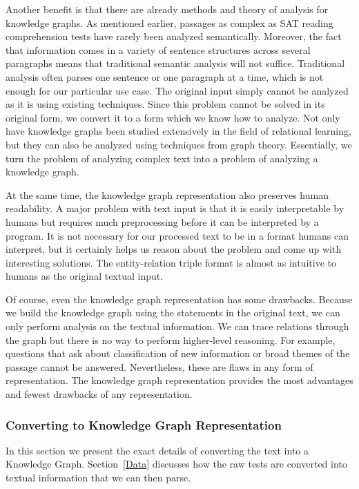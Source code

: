\documentclass[pageno]{jpaper}
\begin{document}
Another benefit is that there are already methods and theory of analysis for
knowledge graphs. As mentioned earlier, passages as complex as SAT reading
comprehension tests have rarely been analyzed semantically. Moreover, the fact
that information comes in a variety of sentence structures across several
paragraphs means that traditional semantic analysis will not suffice.
Traditional analysis often parses one sentence or one paragraph at a time, which
is not enough for our particular use case. The original input simply cannot be
analyzed as it is using existing techniques. Since this problem cannot be solved
in its original form, we convert it to a form which we know how to analyze. Not
only have knowledge graphs been studied extensively in the field of relational
learning, but they can also be analyzed using techniques from graph theory.
Essentially, we turn the problem of analyzing complex text into a problem of
analyzing a knowledge graph.

At the same time, the knowledge graph representation also preserves human
readability. A major problem with text input is that it is easily interpretable
by humans but requires much preprocessing before it can be interpreted by a
program. It is not necessary for our processed text to be in a format humans can
interpret, but it certainly helps us reason about the problem and come up with
interesting solutions. The entity-relation triple format is almost as intuitive
to humans as the original textual input.

Of course, even the knowledge graph representation has some drawbacks. Because
we build the knowledge graph using the statements in the original text, we can
only perform analysis on the textual information. We can trace relations through
the graph but there is no way to perform higher-level reasoning. For example,
questions that ask about classification of new information or broad themes of
the passage cannot be answered. Nevertheless, these are flaws in any form of
representation. The knowledge graph representation provides the most advantages
and fewest drawbacks of any representation. \\

\subsubsection{Converting to Knowledge Graph Representation}
\label{Converting to Knowledge Graph Representation}

In this section we present the exact details of converting the text into a
Knowledge Graph. Section~\ref{Data} discusses how the raw tests are converted
into textual information that we can then parse.
\end{document}
